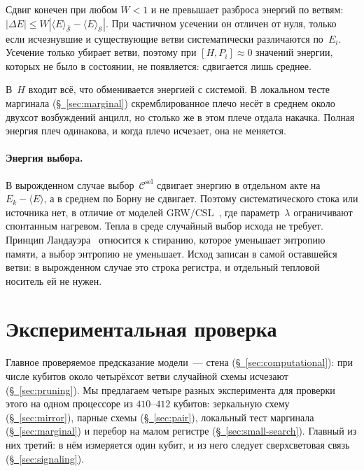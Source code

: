 \documentclass[11pt,a4paper]{article}
\newcommand{\Sinv}{\mathcal{S}}
\begin{document}
Сдвиг конечен при любом $W<1$ и не превышает разброса энергий по ветвям: $|\Delta E|\le W|\langle E\rangle_{\bar{\Sinv}}-\langle E\rangle_{\Sinv}|$. При частичном усечении он отличен от нуля, только если исчезнувшие и существующие ветви систематически различаются по~$E_i$. Усечение только убирает ветви, поэтому при $[H,P_i]\approx0$ значений энергии, которых не было в состоянии, не появляется: сдвигается лишь среднее.

В~$H$ входит всё, что обменивается энергией с системой. В локальном тесте маргинала (\hyperref[sec:marginal]{\S~\ref*{sec:marginal}}) скремблированное плечо несёт в среднем около двухсот возбуждений анцилл, но столько же в этом плече отдала накачка. Полная энергия плеч одинакова, и когда плечо исчезает, она не меняется.

\paragraph{Энергия выбора.}
В вырожденном случае выбор~$\mathcal C^{\mathrm{sel}}$ сдвигает энергию в отдельном акте на $E_k-\langle E\rangle$, а в среднем по Борну не сдвигает. Поэтому систематического стока или источника нет, в отличие от моделей GRW/CSL~\cite{ghirardi1986,ghirardi1990,bassi2013}, где параметр~$\lambda$ ограничивают спонтанным нагревом. Тепла в среде случайный выбор исхода не требует. Принцип Ландауэра~\cite{landauer1961} относится к стиранию, которое уменьшает энтропию памяти, а выбор энтропию не уменьшает. Исход записан в самой оставшейся ветви: в вырожденном случае это строка регистра, и отдельный тепловой носитель ей не нужен.

\section{Экспериментальная проверка}
\label{sec:experiment}

Главное проверяемое предсказание модели~--- стена (\hyperref[sec:computational]{\S~\ref*{sec:computational}}): при числе кубитов около четырёхсот ветви случайной схемы исчезают (\hyperref[sec:pruning]{\S~\ref*{sec:pruning}}). Мы предлагаем четыре разных эксперимента для проверки этого на одном процессоре из $410$--$412$ кубитов: зеркальную схему (\hyperref[sec:mirror]{\S~\ref*{sec:mirror}}), парные схемы (\hyperref[sec:pair]{\S~\ref*{sec:pair}}), локальный тест маргинала (\hyperref[sec:marginal]{\S~\ref*{sec:marginal}}) и перебор на малом регистре (\hyperref[sec:small-search]{\S~\ref*{sec:small-search}}). Главный из них третий: в нём измеряется один кубит, и из него следует сверхсветовая связь (\hyperref[sec:signaling]{\S~\ref*{sec:signaling}}).
\end{document}

